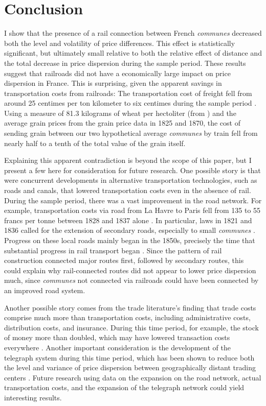 \documentclass[12pt,twoside]{article}
\begin{document}
\section{Conclusion}

I show that the presence of a rail connection between French \emph{communes} decreased both the level and volatility of price differences.
This effect is statistically significant, but ultimately small relative to both the relative effect of distance and the total decrease in price dispersion during the sample period.
These results suggest that railroads did not have a economically large impact on price dispersion in France.
This is surprising, given the apparent savings in transportation costs from railroads: The transportation cost of freight fell from around 25 centimes per ton kilometer to six centimes during the sample period \citep{ville}.
Using a measure of 81.3 kilograms of wheat per hectoliter (from \cite{hectoliter}) and the average grain prices from the grain price data in 1825 and 1870, the cost of sending grain between our two hypothetical average \emph{communes} by train fell from nearly half to a tenth of the total value of the grain itself.

Explaining this apparent contradiction is beyond the scope of this paper, but I present a few here for consideration for future research.
One possible story is that were concurrent developments in alternative transportation technologies, such as roads and canals, that lowered transportation costs even in the absence of rail.
During the sample period, there was a vast improvement in the road network.
For example, transportation costs via road from La Havre to Paris fell from 135 to 55 francs per tonne between 1828 and 1837 alone \citep{price}.
In particular, laws in 1821 and 1836 called for the extension of secondary roads, especially to small \emph{communes} \citep{caron}.
Progress on these local roads mainly began in the 1850s, precisely the time that substantial progress in rail transport began \citep{price}.
Since the pattern of rail construction connected major routes first, followed by secondary routes, this could explain why rail-connected routes did not appear to lower price dispersion much, since \emph{communes} not connected via railroads could have been connected by an improved road system.

Another possible story comes from the trade literature's finding that trade costs comprise much more than transportation costs, including administrative costs, distribution costs, and insurance.
During this time period, for example, the stock of money more than doubled, which may have lowered transaction costs everywhere \citep{caron}.
Another important consideration is the development of the telegraph system during this time period, which has been shown to reduce both the level and variance of price dispersion between geographically distant trading centers \citep{steinwender}.
Future research using data on the expansion on the road network, actual transportation costs, and the expansion of the telegraph network could yield interesting results.

\newpage


 
\end{document}
